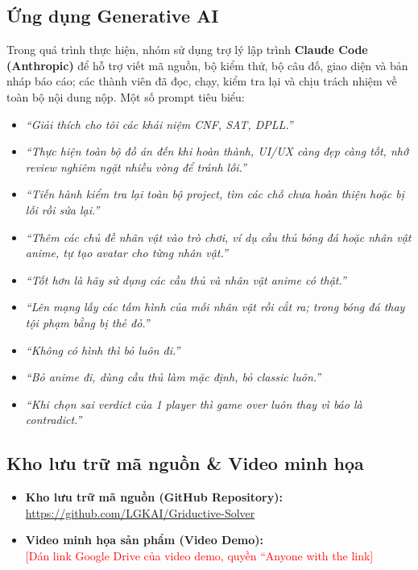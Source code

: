 \documentclass{article}
\begin{document}
\subsection{Ứng dụng Generative AI}
Trong quá trình thực hiện, nhóm sử dụng trợ lý lập trình \textbf{Claude Code (Anthropic)} để hỗ trợ viết mã nguồn, bộ kiểm thử, bộ câu đố, giao diện và bản nháp báo cáo; các thành viên đã đọc, chạy, kiểm tra lại và chịu trách nhiệm về toàn bộ nội dung nộp. Một số prompt tiêu biểu:
\begin{itemize}[noitemsep]
    \item \textit{``Giải thích cho tôi các khái niệm CNF, SAT, DPLL.''}
    \item \textit{``Thực hiện toàn bộ đồ án đến khi hoàn thành, UI/UX càng đẹp càng tốt, nhớ review nghiêm ngặt nhiều vòng để tránh lỗi.''}
    \item \textit{``Tiến hành kiểm tra lại toàn bộ project, tìm các chỗ chưa hoàn thiện hoặc bị lỗi rồi sửa lại.''}
    \item \textit{``Thêm các chủ đề nhân vật vào trò chơi, ví dụ cầu thủ bóng đá hoặc nhân vật anime, tự tạo avatar cho từng nhân vật.''}
    \item \textit{``Tốt hơn là hãy sử dụng các cầu thủ và nhân vật anime có thật.''}
    \item \textit{``Lên mạng lấy các tấm hình của mỗi nhân vật rồi cắt ra; trong bóng đá thay tội phạm bằng bị thẻ đỏ.''}
    \item \textit{``Không có hình thì bỏ luôn đi.''}
    \item \textit{``Bỏ anime đi, dùng cầu thủ làm mặc định, bỏ classic luôn.''}
    \item \textit{``Khi chọn sai verdict của 1 player thì game over luôn thay vì báo là contradict.''}
\end{itemize}

\subsection{Kho lưu trữ mã nguồn \& Video minh họa}
\begin{itemize}
    \item \textbf{Kho lưu trữ mã nguồn (GitHub Repository):} \\
    \url{https://github.com/LGKAI/Griductive-Solver}

    \item \textbf{Video minh họa sản phẩm (Video Demo):} \\
    \textcolor{red}{[Dán link Google Drive của video demo, quyền ``Anyone with the link]}
\end{itemize}
\end{document}

